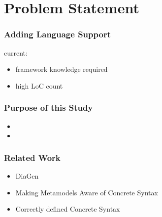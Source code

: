 \section{Problem Statement}
\begin{frame}
  \frametitle{}
  \centering
  \hspace{-1cm}
  \huge
\end{frame}


\begin{frame}
  \frametitle{Adding Language Support}
  current:
  \begin{itemize}
    \item framework knowledge required
    \item high LoC count
  \end{itemize}
\end{frame}

\begin{frame}
  \frametitle{Purpose of this Study}
  \vspace{-1cm}
   \begin{itemize}
     \item {}
     \item {}
   \end{itemize} 
\end{frame}

\begin{frame}
  \frametitle{Related Work}
  \vspace{-1cm}
  \begin{itemize}
    \setlength\itemsep{.5cm}
    \item DiaGen \footnotesize \cite{minas_concepts_2002} \normalsize
    \item Making Metamodels Aware of Concrete Syntax \footnotesize \cite{fondement_making_2005} \normalsize
    \item Correctly defined Concrete Syntax \footnotesize \cite{baar_correctly_2008} \normalsize
  \end{itemize}

  

\end{frame}

\begin{frame}
  \centering
  \hspace{-1cm}
  \huge
\end{frame}


